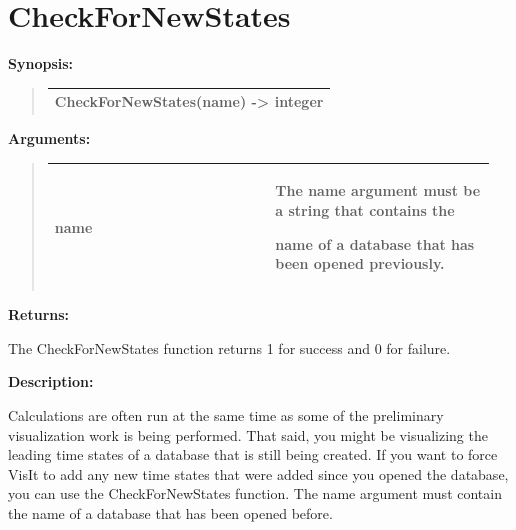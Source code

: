 \documentclass[letterpaper,10pt,english]{sphinxmanual}
\begin{document}
\section{CheckForNewStates}
\label{functions:checkfornewstates}
\begin{DUlineblock}{0em}
\item[] \textbf{Synopsis:}
\end{DUlineblock}
\begin{quote}

\begin{tabulary}{\linewidth}{|L|}
\hline

CheckForNewStates(name) -\textgreater{} integer
\\
\hline\end{tabulary}

\end{quote}

\begin{DUlineblock}{0em}
\item[] 
\item[] \textbf{Arguments:}
\end{DUlineblock}
\begin{quote}

\begin{tabular}{|p{0.475\linewidth}|p{0.475\linewidth}|}
\hline

name
 & 
\begin{DUlineblock}{0em}
\item[] The name argument must be a string that contains the
\item[] name of a database that has been opened previously.
\end{DUlineblock}
\\
\hline\end{tabular}

\end{quote}

\begin{DUlineblock}{0em}
\item[] 
\item[] \textbf{Returns:}
\item[] The CheckForNewStates function returns 1 for success and 0 for failure.
\item[] 
\item[] \textbf{Description:}
\item[] Calculations are often run at the same time as some of the preliminary
visualization work is being performed. That said, you might be visualizing
the leading time states of a database that is still being created. If you
want to force VisIt to add any new time states that were added since you
opened the database, you can use the CheckForNewStates function. The name
argument must contain the name of a database that has been opened before.
\end{DUlineblock}
\end{document}
